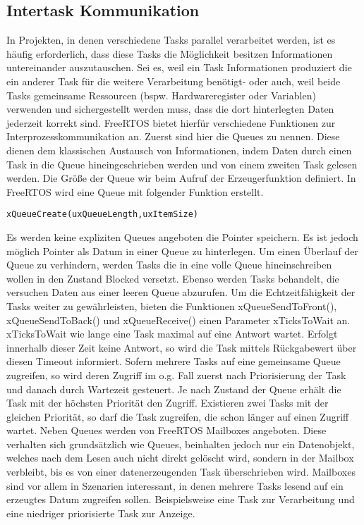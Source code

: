 \subsection{Intertask Kommunikation}
In Projekten, in denen verschiedene Tasks parallel verarbeitet werden, ist es häufig erforderlich, dass diese Tasks die Möglichkeit besitzen Informationen untereinander auszutauschen. Sei es, weil ein Task Informationen produziert die ein anderer Task für die weitere Verarbeitung benötigt- oder auch, weil beide Tasks gemeinsame Ressourcen (bspw. Hardwareregister oder Variablen) verwenden und sichergestellt werden muss, dass die dort hinterlegten Daten jederzeit korrekt sind. FreeRTOS bietet hierfür verschiedene Funktionen zur Interprozesskommunikation an. Zuerst sind hier die Queues zu nennen. Diese dienen dem klassischen Austausch von Informationen, indem Daten durch einen Task in die Queue hineingeschrieben werden und von einem zweiten Task gelesen werden. Die Größe der Queue wir beim Aufruf der Erzeugerfunktion definiert. In FreeRTOS wird eine Queue mit folgender Funktion erstellt. 
\begin{lstlisting}[numbers = none]
xQueueCreate(uxQueueLength,uxItemSize)
\end{lstlisting}
Es werden keine expliziten Queues angeboten die Pointer speichern. Es ist jedoch möglich Pointer als Datum in einer Queue zu hinterlegen. Um einen Überlauf der Queue zu verhindern, werden Tasks die in eine volle Queue hineinschreiben wollen in den Zustand Blocked versetzt. Ebenso werden Tasks behandelt, die versuchen Daten aus einer leeren Queue abzurufen. Um die Echtzeitfähigkeit der Tasks weiter zu gewährleisten, bieten die Funktionen xQueueSendToFront(), xQueueSendToBack() und xQueueReceive() einen Parameter xTicksToWait an. xTicksToWait wie lange eine Task maximal auf eine Antwort wartet. Erfolgt innerhalb dieser Zeit keine Antwort, so wird die Task mittels Rückgabewert über diesen Timeout informiert.
Sofern mehrere Tasks auf eine gemeinsame Queue zugreifen, so wird deren Zugriff im o.g. Fall zuerst nach Priorisierung der Task und danach durch Wartezeit gesteuert. Je nach Zustand der Queue erhält die Task mit der höchsten Priorität den Zugriff. Existieren zwei Tasks mit der gleichen Priorität, so darf die Task zugreifen, die schon länger auf einen Zugriff wartet.
Neben Queues werden von FreeRTOS Mailboxes angeboten. Diese verhalten sich grund\-sätz\-lich wie Queues, beinhalten jedoch nur ein Datenobjekt, welches nach dem Lesen auch nicht direkt gelöscht wird, sondern in der Mailbox verbleibt, bis es von einer datenerzeugenden Task überschrieben wird. Mailboxes sind vor allem in Szenarien interessant, in denen mehrere Tasks lesend auf ein erzeugtes Datum zugreifen sollen. Beispielsweise eine Task zur Verarbeitung und eine niedriger priorisierte Task zur Anzeige.
